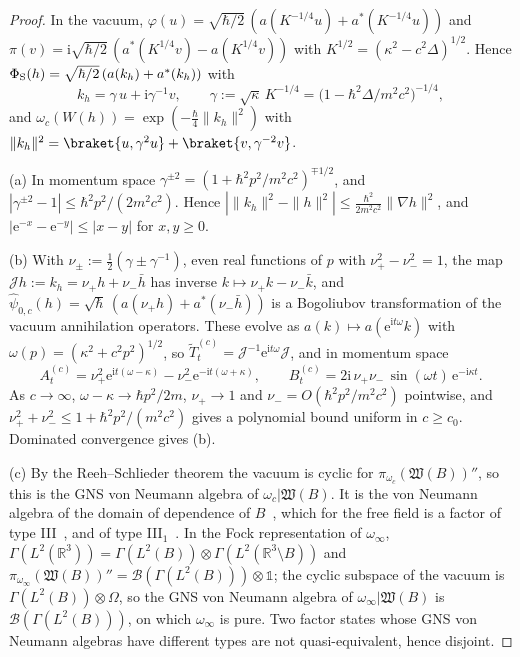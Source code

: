 \documentclass[%
 aip,
 jmp,
 amsmath,amssymb,
 reprint, onecolumn
]{revtex4-1}
\theoremstyle{definition}
\theoremstyle{remark}
\newcommand{\R}{\mathbb{R}}
\newcommand{\one}{\mathds{1}}
\newcommand{\rmi}{\mathrm{i}}
\newcommand{\rme}{\mathrm{e}}
\begin{document}
\begin{proof}
In the vacuum, $\varphi(u)=\sqrt{\hbar/2}\,(a(K^{-1/4}u)+a^*(K^{-1/4}u))$
and $\pi(v)=\rmi\sqrt{\hbar/2}\,(a^*(K^{1/4}v)-a(K^{1/4}v))$ with
$K^{1/2}=(\kappa^2-c^2\Delta)^{1/2}$. Hence $\Phi_{\rm S}(h)=\sqrt{\hbar/2}\,
(a(k_h)+a^*(k_h))$ with
\begin{equation}\label{eq:kh}
k_h=\gamma\,u+\rmi\gamma^{-1}v,\qquad \gamma:=\sqrt\kappa\,K^{-1/4}
=\bigl(1-\hbar^2\Delta/m^2c^2\bigr)^{-1/4},
\end{equation}
and $\omega_c(W(h))=\exp(-\frac\hbar4\|k_h\|^2)$ with $\|k_h\|^2=
\braket{u,\gamma^2u}+\braket{v,\gamma^{-2}v}$.

(a) In momentum space $\gamma^{\pm2}=(1+\hbar^2p^2/m^2c^2)^{\mp1/2}$, and
$|\gamma^{\pm2}-1|\leq\hbar^2p^2/(2m^2c^2)$. Hence $|\|k_h\|^2-\|h\|^2|
\leq\frac{\hbar^2}{2m^2c^2}\|\nabla h\|^2$, and $|\rme^{-x}-\rme^{-y}|\leq
|x-y|$ for $x,y\geq0$.

(b) With $\nu_\pm:=\frac12(\gamma\pm\gamma^{-1})$, even real functions of
$p$ with $\nu_+^2-\nu_-^2=1$, the map $\mathcal J h:=k_h=\nu_+h+\nu_-\bar
h$ has inverse $k\mapsto\nu_+k-\nu_-\bar k$, and $\hat\psi_{0,c}(h)=
\sqrt\hbar\,(a(\nu_+h)+a^*(\nu_-\bar h))$ is a Bogoliubov transformation of the vacuum annihilation
operators. These evolve as $a(k)\mapsto a(\rme^{\rmi t\omega}k)$ with
$\omega(p)=(\kappa^2+c^2p^2)^{1/2}$, so $\tilde T^{(c)}_t=\mathcal J^{-1}
\rme^{\rmi t\omega}\mathcal J$, and in momentum space
\[
A^{(c)}_t=\nu_+^2\rme^{\rmi t(\omega-\kappa)}-\nu_-^2
\rme^{-\rmi t(\omega+\kappa)},\qquad
B^{(c)}_t=2\rmi\,\nu_+\nu_-\,\sin(\omega t)\,\rme^{-\rmi\kappa t}.
\]
As $c\to\infty$, $\omega-\kappa\to\hbar p^2/2m$, $\nu_+\to1$ and
$\nu_-=O(\hbar^2p^2/m^2c^2)$ pointwise, and $\nu_+^2+\nu_-^2\leq
1+\hbar^2p^2/(m^2c^2)$ gives a polynomial bound uniform in $c\geq c_0$.
Dominated convergence gives (b).

(c) By the Reeh--Schlieder theorem the vacuum is cyclic for
$\pi_{\omega_c}(\mathfrak W(B))''$, so this is the GNS von Neumann algebra
of $\omega_c|\mathfrak W(B)$. It is the von Neumann algebra of the domain
of dependence of $B$~\cite{Araki1963}, which for the free field is a
factor of type III~\cite{Araki1964b}, and of type
III$_1$~\cite{BuchholzDAntoniFredenhagen1987,Verch1997}. In the Fock
representation of $\omega_\infty$, $\Gamma(L^2(\R^3))=\Gamma(L^2(B))
\otimes\Gamma(L^2(\R^3\setminus B))$ and $\pi_{\omega_\infty}(\mathfrak
W(B))''=\mathcal{B}(\Gamma(L^2(B)))\otimes\one$; the cyclic subspace of
the vacuum is $\Gamma(L^2(B))\otimes\Omega$, so the GNS von Neumann
algebra of $\omega_\infty|\mathfrak W(B)$ is $\mathcal{B}(\Gamma(L^2(B)))$,
on which $\omega_\infty$ is pure. Two factor states whose GNS von Neumann
algebras have different types are not quasi-equivalent, hence
disjoint.


\end{proof}
\end{document}
